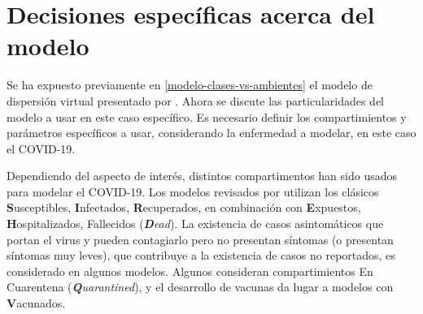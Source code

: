 \section{Decisiones específicas acerca del modelo} \label{met:decisiones}














Se ha expuesto previamente en \ref{modelo-clases-vs-ambientes} el modelo de dispersión virtual presentado por \cite{Bichara2015}. Ahora se discute las particularidades del modelo a usar en este caso específico. Es necesario definir los compartimientos y parámetros específicos a usar, considerando la enfermedad a modelar, en este caso el COVID-19.


Dependiendo del aspecto de interés, distintos compartimentos han sido usados para modelar el COVID-19. Los modelos revisados por \cite{Xiang2021} utilizan los clásicos \textbf{S}usceptibles, \textbf{I}nfectados, \textbf{R}ecuperados, en combinación con \textbf{E}xpuestos, \textbf{H}ospitalizados, Fallecidos (\textit{\textbf{D}ead}). La existencia de casos asintomáticos que portan el virus y pueden contagiarlo pero no presentan síntomas (o presentan síntomas muy leves), que contribuye a la existencia de casos no reportados, es considerado en algunos modelos. Algunos consideran compartimientos En Cuarentena (\textit{\textbf{Q}uarantined}), y el desarrollo de vacunas da lugar a modelos con \textbf{V}acunados.

